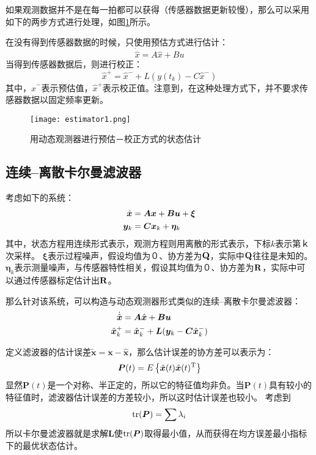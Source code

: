 如果观测数据并不是在每一拍都可以获得（传感器数据更新较慢），那么可以采用如下的两步方式进行处理，如图\ref{fig: estimator1}所示。

在没有得到传感器数据的时候，只使用预估方式进行估计：
\begin{equation}
    \dot{\hat{x}} = A \hat{x} + B u    
\end{equation}
当得到传感器数据后，则进行校正：
\begin{equation}
    \hat{x}^+ = \hat{x}^- + L(y(t_k) - C \hat{x}^-)
\end{equation}
其中，$\hat{x}^-$表示预估值，$\hat{x}^+$表示校正值。注意到，在这种处理方式下，并不要求传感器数据以固定频率更新。
\begin{figure}[htbp]
	\figskip
	\centering
	\texttt{[image: estimator1.png]}	  
	\caption{\label{fig: estimator1} 用动态观测器进行预估－校正方式的状态估计}
\end{figure} 

\subsection{连续--离散卡尔曼滤波器}
考虑如下的系统：
\begin{align}
    \dot{\bm{x}} &= \bm{A} \bm{x} + \bm{B} \bm{u} + \bm{\xi} \notag \\
    \bm{y}_k &= \bm{C} \bm{x}_k + \bm{\eta}_k
\end{align}
其中，状态方程用连续形式表示，观测方程则用离散的形式表示，下标$k$表示第ｋ次采样。
$\bm{\xi}$表示过程噪声，假设均值为０、协方差为$\bf{Q}$，实际中$\bf{Q}$往往是未知的。
$\bm{\eta}_k$表示测量噪声，与传感器特性相关，假设其均值为０、协方差为$\bf{R}$，实际中可以通过传感器标定估计出$\bf{R}$。

那么针对该系统，可以构造与动态观测器形式类似的连续--离散卡尔曼滤波器：
\begin{align}
    \dot{\hat{\bm{x}}} &= \bm{A} \hat{\bm{x}} + \bm{B} \bm{u} \notag \\
    \hat{\bm{x}}^+_k &= \hat{\bm{x}}^-_k + \bm{L} (\bm{y}_k - \bm{C} \hat{\bm{x}}^-_k)
\end{align}

定义滤波器的估计误差$\tilde{\bm{x}} = \bm{x} - \hat{\bm{x}}$，那么估计误差的协方差可以表示为：
\begin{equation}
    \bm{P}(t) = E\left\{ \tilde{\bm{x}}(t) \tilde{\bm{x}}(t)^\uT \right\}
\end{equation}
显然$\bm{P}(t)$是一个对称、半正定的，所以它的特征值均非负。当$\bm{P}(t)$具有较小的特征值时，滤波器估计误差的方差较小，所以这时估计误差也较小。
考虑到
\begin{equation*}
    \rm{tr}(\bm{P}) = \sum{\lambda_i}
\end{equation*} 
{\color{red}所以卡尔曼滤波器就是求解$\bm{L}$使$\rm{tr}(\bm{P})$取得最小值，从而获得在均方误差最小指标下的最优状态估计。}

